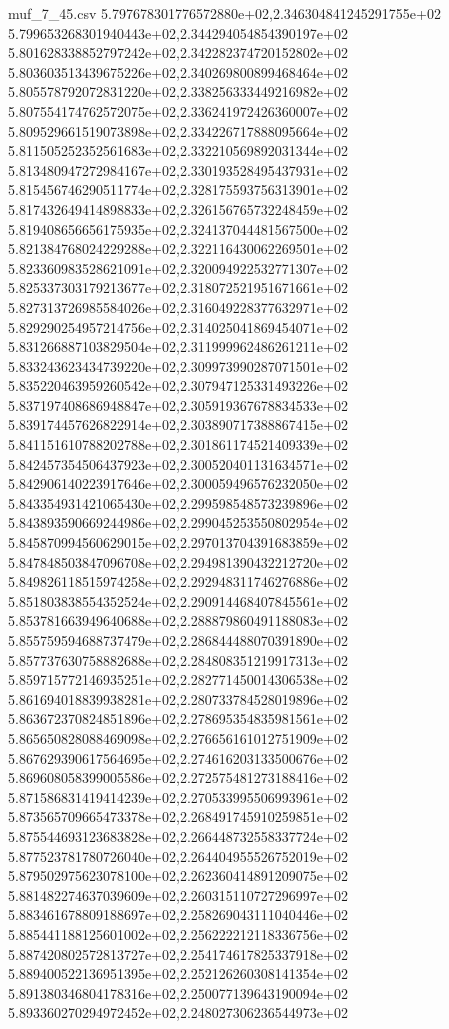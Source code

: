 \begin{filecontents*}{muf_7_45.csv}
5.797678301776572880e+02,2.346304841245291755e+02
5.799653268301940443e+02,2.344294054854390197e+02
5.801628338852797242e+02,2.342282374720152802e+02
5.803603513439675226e+02,2.340269800899468464e+02
5.805578792072831220e+02,2.338256333449216982e+02
5.807554174762572075e+02,2.336241972426360007e+02
5.809529661519073898e+02,2.334226717888095664e+02
5.811505252352561683e+02,2.332210569892031344e+02
5.813480947272984167e+02,2.330193528495437931e+02
5.815456746290511774e+02,2.328175593756313901e+02
5.817432649414898833e+02,2.326156765732248459e+02
5.819408656656175935e+02,2.324137044481567500e+02
5.821384768024229288e+02,2.322116430062269501e+02
5.823360983528621091e+02,2.320094922532771307e+02
5.825337303179213677e+02,2.318072521951671661e+02
5.827313726985584026e+02,2.316049228377632971e+02
5.829290254957214756e+02,2.314025041869454071e+02
5.831266887103829504e+02,2.311999962486261211e+02
5.833243623434739220e+02,2.309973990287071501e+02
5.835220463959260542e+02,2.307947125331493226e+02
5.837197408686948847e+02,2.305919367678834533e+02
5.839174457626822914e+02,2.303890717388867415e+02
5.841151610788202788e+02,2.301861174521409339e+02
5.842457354506437923e+02,2.300520401131634571e+02
5.842906140223917646e+02,2.300059496576232050e+02
5.843354931421065430e+02,2.299598548573239896e+02
5.843893590669244986e+02,2.299045253550802954e+02
5.845870994560629015e+02,2.297013704391683859e+02
5.847848503847096708e+02,2.294981390432212720e+02
5.849826118515974258e+02,2.292948311746276886e+02
5.851803838554352524e+02,2.290914468407845561e+02
5.853781663949640688e+02,2.288879860491188083e+02
5.855759594688737479e+02,2.286844488070391890e+02
5.857737630758882688e+02,2.284808351219917313e+02
5.859715772146935251e+02,2.282771450014306538e+02
5.861694018839938281e+02,2.280733784528019896e+02
5.863672370824851896e+02,2.278695354835981561e+02
5.865650828088469098e+02,2.276656161012751909e+02
5.867629390617564695e+02,2.274616203133500676e+02
5.869608058399005586e+02,2.272575481273188416e+02
5.871586831419414239e+02,2.270533995506993961e+02
5.873565709665473378e+02,2.268491745910259851e+02
5.875544693123683828e+02,2.266448732558337724e+02
5.877523781780726040e+02,2.264404955526752019e+02
5.879502975623078100e+02,2.262360414891209075e+02
5.881482274637039609e+02,2.260315110727296997e+02
5.883461678809188697e+02,2.258269043111040446e+02
5.885441188125601002e+02,2.256222212118336756e+02
5.887420802572813727e+02,2.254174617825337918e+02
5.889400522136951395e+02,2.252126260308141354e+02
5.891380346804178316e+02,2.250077139643190094e+02
5.893360270294972452e+02,2.248027306236544973e+02

\end{filecontents*}
